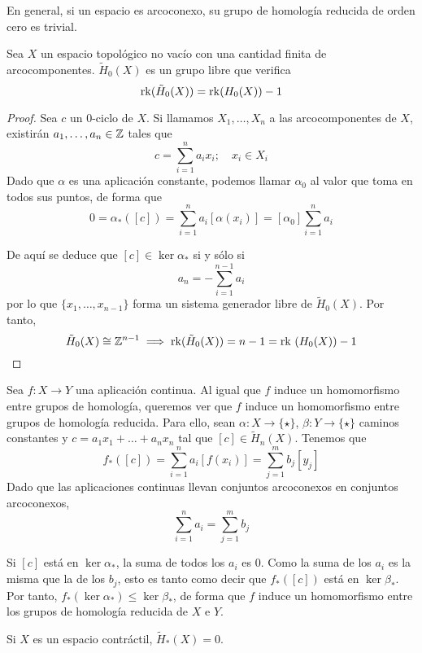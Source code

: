 En general, si un espacio es arcoconexo, su grupo de homología reducida de
orden cero es trivial.

\begin{proposition}
Sea $X$ un espacio topológico no vacío con una cantidad finita de
arcocomponentes. $\tilde{H}_0(X)$ es un grupo libre que verifica
\[\operatorname{rk}(\tilde{H}_0(X))=\operatorname{rk}(H_0(X))-1\]
\end{proposition}

\begin{proof}
Sea $c$ un $0$-ciclo de $X$. Si llamamos $X_1,\dots,X_n$ a las
arcocomponentes de $X$, existirán $a_1,\dots,a_n \in \mathbb{Z}$ tales que
\[c=\sum^n_{i=1}a_ix_i; \quad x_i \in X_i\]
Dado que $\alpha$ es una aplicación constante, podemos llamar $\alpha_0$ al
valor que toma en todos sus puntos, de forma que
\[0=\alpha_*([c])=\sum^n_{i=1}a_i[\alpha(x_i)]=[\alpha_0]\sum^n_{i=1}a_i\]

De aquí se deduce que $[c] \in \ker \alpha_*$ si y sólo si
\[a_n=-\sum^{n-1}_{i=1}a_i\]
por lo que $\{x_1,\dots,x_{n-1}\}$ forma un sistema generador libre de
$\tilde{H}_0(X)$. Por tanto,
\[\tilde{H}_0(X) \cong \mathbb{Z}^{n-1} \implies \operatorname{rk}(\tilde{H}_0(X))=
n-1=\mbox{rk }(H_0(X))-1\]
\end{proof}

Sea $f\colon X \to Y$ una aplicación continua. Al igual que $f$ induce un
homomorfismo entre grupos de homología, queremos ver que $f$ induce un
homomorfismo entre grupos de homología reducida. Para ello, sean $\alpha\colon
X \to \{\star\}$, $\beta\colon Y \to \{\star\}$ caminos constantes y $c=a_1x_1+
\dots+a_nx_n$ tal que $[c] \in \tilde H_n(X)$. Tenemos que
\[f_*([c])=\sum^n_{i=1}a_i[f(x_i)]=\sum^m_{j=1}b_j[y_j]\]
Dado que las aplicaciones continuas llevan conjuntos arcoconexos en conjuntos
arcoconexos,
\[\sum^n_{i=1}a_i=\sum^m_{j=1}b_j\]

Si $[c]$ está en $\ker \alpha_*$, la suma de todos los $a_i$ es 0. Como la
suma de los $a_i$ es la misma que la de los $b_j$, esto es tanto como decir
que $f_*([c])$ está en $\ker \beta_*$. Por tanto, $f_*(\ker \alpha_*) \leq
\ker \beta_*$, de forma que $f$ induce un homomorfismo entre los grupos de
homología reducida de $X$ e $Y$.

\begin{example}
Si $X$ es un espacio contráctil, $\tilde{H}_*(X)=0$.
\end{example}

